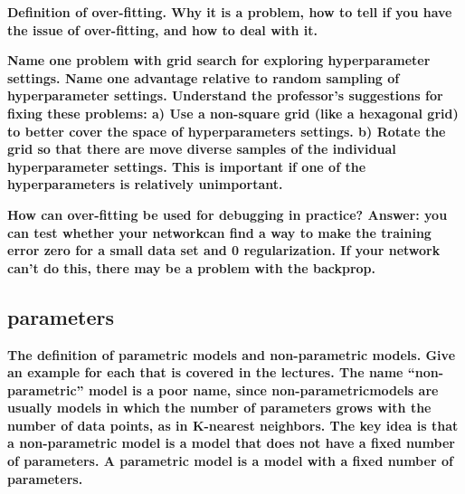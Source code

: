 \documentclass[10pt,letterpaper]{article}
\begin{document}
\subitem \textbf{ Definition of over-fitting. Why it is a problem, how to tell if you have the issue of over-fitting, and how to deal with it.}
\begin{solution}
\end{solution}

\subitem \textbf{ Name one problem with grid search for exploring hyperparameter settings. Name one advantage relative to random sampling of hyperparameter settings. Understand the professor’s suggestions for fixing these problems: 
\subsubitem  a) Use a non-square grid (like a hexagonal grid) to better cover the space of hyperparameters settings.
\subsubitem  b) Rotate the grid so that there are move diverse samples of the individual hyperparameter settings. This is important if one of the hyperparameters is relatively unimportant.}
\begin{solution}
\end{solution}

\subitem \textbf{ How can over-fitting be used for debugging in practice? Answer: you can test whether your networkcan find a way to make the training error zero for a small data set and 0 regularization. If your network can’t do this, there may be a problem with the backprop. }
\begin{solution}
\end{solution}

\subsection{parameters}
\subitem \textbf{ The definition of parametric models and non-parametric models. Give an example for each that is covered in the lectures. The name “non-parametric” model is a poor name, since non-parametricmodels are usually models in which the number of parameters grows with the number of data points, as in K-nearest neighbors. The key idea is that a non-parametric model is a model that does not have a fixed number of parameters. A parametric model is a model with a fixed number of parameters. }
\begin{solution}
\end{solution}
\end{document}
